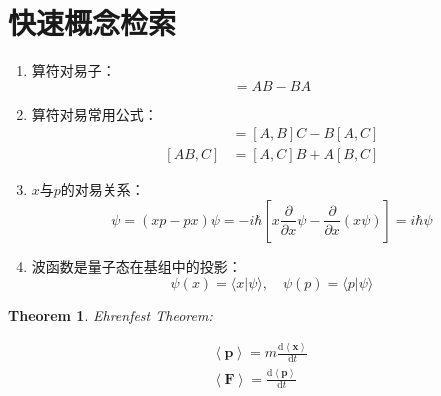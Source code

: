 \documentclass[12pt,a4paper,openany,twoside]{book}
\newtheorem{theorem}{Theorem}[section]
\numberwithin{equation}{section}
\newcommand{\mean}[1]{\left\langle #1 \right\rangle}
\newcommand{\ud}{\mathrm{d}}
\begin{document}
      \section{快速概念检索}
        \begin{enumerate}
          \item 算符对易子：
            \begin{equation}
              [A,B] = AB - BA
            \end{equation}

          \item 算符对易常用公式：
            \begin{align}
              [A,BC]& = [A,B]C - B[A,C]\\
              [AB,C]& = [A,C]B + A[B,C]
            \end{align}

          \item $x$与$p$的对易关系：
            \begin{equation}
              [x,p]\psi=(xp-px)\psi = -i\hbar[x \frac{\partial}{\partial x}\psi-\frac{\partial}{\partial x}(x\psi)]= i\hbar \psi
            \end{equation}

          \item 波函数是量子态在基组中的投影：
            \begin{equation}
              \psi (x) = \langle x | \psi \rangle , \quad \psi(p) = \langle p | \psi \rangle
            \end{equation} 
        \end{enumerate}
      

        \begin{theorem}
          Ehrenfest Theorem:
          
          \begin{align}
            \mean{\textbf{p}}= m \frac{\ud\mean{\textbf{x}}}{\ud t}\\
            \mean{\textbf{F}}= \frac{\ud\mean{\textbf{p}}}{\ud t}
          \end{align}
        \end{theorem}
\end{document}
